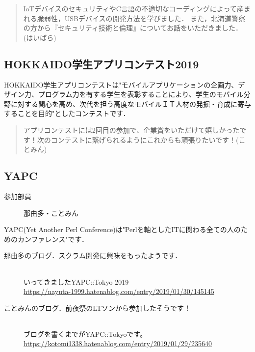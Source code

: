 \begin{quotation}
IoTデバイスのセキュリティやC言語の不適切なコーディングによって産まれる脆弱性，USBデバイスの開発方法を学びました．
また，北海道警察の方から『セキュリティ技術と倫理』についてお話をいただきました．(はいばら)
\end{quotation}

\subsection{HOKKAIDO学生アプリコンテスト2019}
HOKKAIDO学生アプリコンテストは"モバイルアプリケーションの企画力、デザイン力、プログラム力を有する学生を表彰することにより、学生のモバイル分野に対する関心を高め、次代を担う高度なモバイルＩＴ人材の発掘・育成に寄与することを目的"としたコンテストです．\mbox{}\\

\begin{quotation}
アプリコンテストには2回目の参加で、企業賞をいただけて嬉しかったです！次のコンテストに繋げられるようにこれからも頑張りたいです！(ことみん)
\end{quotation}

\subsection{YAPC}
\begin{description}
\item[参加部員] 那由多・ことみん
\end{description}
YAPC(Yet Another Perl Conference)は"Perlを軸としたITに関わる全ての人のためのカンファレンス"です．\mbox{}\\

\begin{description}
\item[那由多のブログ．スクラム開発に興味をもったようです．]\mbox{}\\
いってきましたYAPC::Tokyo 2019\mbox{}\\
\url{https://nayuta-1999.hatenablog.com/entry/2019/01/30/145145}
\end{description}

\begin{description}
\item[ことみんのブログ．前夜祭のLTソンから参加したそうです！]\mbox{}\\
ブログを書くまでがYAPC::Tokyoです。\mbox{}\\
\url{https://kotomi1338.hatenablog.com/entry/2019/01/29/235640}
\end{description}

